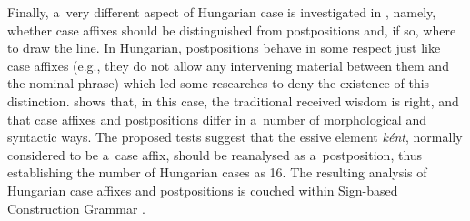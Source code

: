 \documentclass[output=paper]{langsci/langscibook}
\begin{document}
Finally, a~very different aspect of Hungarian case is investigated in \citealt{thui:11}, namely, whether case affixes should be distinguished from postpositions and, if so, where to draw the line.  In Hungarian, postpositions behave in some respect just like case affixes (e.g., they do not allow any intervening material between them and the nominal phrase) which led some researches to deny the existence of this distinction.  \citealt{thui:11} shows that, in this case, the traditional received wisdom is right, and that case affixes and postpositions differ in a~number of morphological and syntactic ways.  The proposed tests suggest that the essive element \emph{k{\'e}nt}, normally considered to be a~case affix, should be reanalysed as a~postposition, thus establishing the number of Hungarian cases as 16.  The resulting analysis of Hungarian case affixes and postpositions is couched within Sign-based Construction Grammar \citep{BS2012a-ed}.


{\sloppy
\printbibliography[heading=subbibliography,notkeyword=this] 
}
\end{document}

